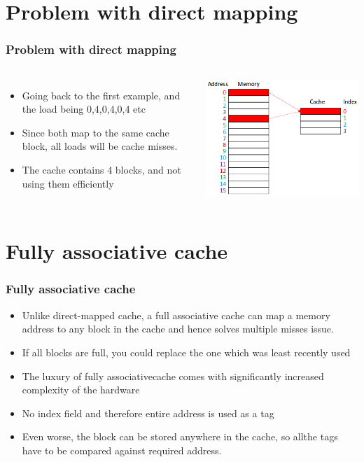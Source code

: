 \documentclass{beamer}
\begin{document}
\section{Problem with direct mapping}
\begin{frame}
\frametitle{Problem with direct mapping}
\begin{columns}[c]
\begin{itemize}
\item Going back to the first example, and the load being 0,4,0,4,0,4 etc
\item Since both map to the same cache block, all loads will be cache misses.
\item The cache contains 4 blocks, and not using them efficiently
\end{itemize}
\includegraphics[scale=0.35]{prob.png}
\end{columns}
\end{frame}
\section{Fully associative cache}
\begin{frame}
\frametitle{Fully associative cache}
\begin{itemize}
\item Unlike direct-mapped cache, a {\color{red}full associative cache} can map a memory address to any block in the cache and hence solves multiple misses issue.
\item If all blocks are full, you could replace the one which was {\color{green}least recently used}
\item The luxury of fully associativecache comes with significantly increased complexity of the hardware
\item No index field and therefore entire address is used as a tag
\item Even worse, the block can be stored anywhere in the cache, so allthe tags have to be compared against required address.
\end{itemize}
\end{frame}
\end{document}
